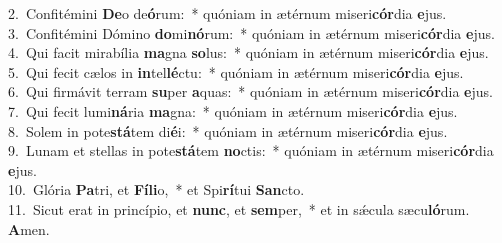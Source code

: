 {2.~}Confitémini \textbf{De}o de\textbf{ó}rum:~* quóniam in ætérnum miseri\textbf{cór}dia \textbf{e}jus.\\
{3.~}Confitémini Dómino \textbf{do}mi\textbf{nó}rum:~* quóniam in ætérnum miseri\textbf{cór}dia \textbf{e}jus.\\
{4.~}Qui facit mirabília \textbf{ma}gna \textbf{so}lus:~* quóniam in ætérnum miseri\textbf{cór}dia \textbf{e}jus.\\
{5.~}Qui fecit cælos in \textbf{in}tel\textbf{lé}ctu:~* quóniam in ætérnum miseri\textbf{cór}dia \textbf{e}jus.\\
{6.~}Qui firmávit terram \textbf{su}per \textbf{a}quas:~* quóniam in ætérnum miseri\textbf{cór}dia \textbf{e}jus.\\
{7.~}Qui fecit lumi\textbf{ná}ria \textbf{ma}gna:~* quóniam in ætérnum miseri\textbf{cór}dia \textbf{e}jus.\\
{8.~}Solem in pote\textbf{stá}tem di\textbf{é}i:~* quóniam in ætérnum miseri\textbf{cór}dia \textbf{e}jus.\\
{9.~}Lunam et stellas in pote\textbf{stá}tem \textbf{no}ctis:~* quóniam in ætérnum miseri\textbf{cór}dia \textbf{e}jus.\\
{10.~}Glória \textbf{Pa}tri, et \textbf{Fí}\textbf{li}o,~* et Spi\textbf{rí}tui \textbf{San}cto.\\
{11.~}Sicut erat in princípio, et \textbf{nunc}, et \textbf{sem}per,~* et in sǽcula sæcu\textbf{ló}rum. \textbf{A}men.\\
